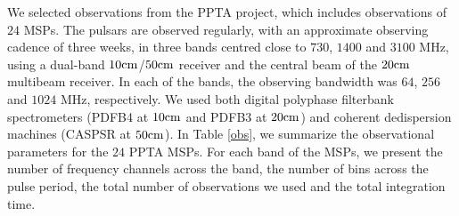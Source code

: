\documentclass[useAMS,usenatbib]{mn2e}
\begin{document}
We selected observations from the PPTA project, which includes observations 
of $24$ MSPs. 
%
The pulsars are observed regularly, with an approximate observing cadence of 
three weeks, in three bands centred close to $730$, $1400$ and $3100$ MHz, 
using a dual-band $10\rm{cm}$/$50\rm{cm}$ receiver and the central beam 
of the $20\rm{cm}$ multibeam receiver. In each of the bands, the observing 
bandwidth was $64$, $256$ and $1024$ MHz, respectively. 
%
We used both digital polyphase filterbank spectrometers (PDFB4 at $10\rm{cm}$ 
and PDFB3 at $20\rm{cm}$) and coherent dedispersion machines (CASPSR at $50\rm{cm}$). 
%
In Table \ref{obs}, we summarize the observational parameters for the $24$ PPTA MSPs. 
%
For each band of the MSPs, we present the number of frequency channels across 
the band, the number of bins across the pulse period, the total number 
of observations we used and the total integration time.
%
%
\end{document}
